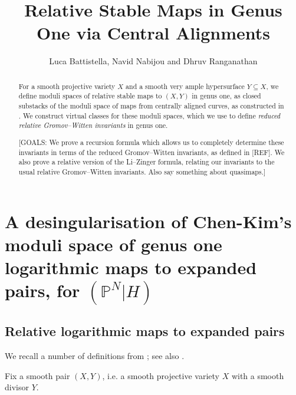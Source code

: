 \documentclass[11pt]{amsart}
\title[Genus One Reduced Relative Invariants]{Relative Stable Maps in Genus One via Central Alignments}
\author{Luca Battistella, Navid Nabijou and Dhruv Ranganathan}
\date{\thismonthyear}
\newcommand{\PP}{\mathbb P}
\theoremstyle{definition}
\theoremstyle{definition}
\begin{document}
\begin{abstract} For a smooth projective variety $X$ and a smooth very ample hypersurface $Y \subseteq X$, we define moduli spaces of relative stable maps to $(X,Y)$ in genus one, as closed substacks of the moduli space of maps from centrally aligned curves, as constructed in \cite{RSPW}. We construct virtual classes for these moduli spaces, which we use to define \emph{reduced relative Gromov--Witten invariants} in genus one.

[GOALS: We prove a recursion formula which allows us to completely determine these invariants in terms of the reduced Gromov--Witten invariants, as defined in [REF]. We also prove a relative version of the Li--Zinger formula, relating our invariants to the usual relative Gromov--Witten invariants. Also say something about quasimaps.]
\end{abstract}

\maketitle

\appendixtitletocoff
\tableofcontents

\section{A desingularisation of Chen-Kim's moduli space of genus one logarithmic maps to expanded pairs, for $(\PP^N|H)$}

\subsection{Relative logarithmic maps to expanded pairs} We recall a number of definitions from \cite{ChenDegeneration}; see also \cite{KimLog}.

Fix a smooth pair $(X,Y)$, i.e. a smooth projective variety $X$ with a smooth divisor $Y$.
\end{document}
